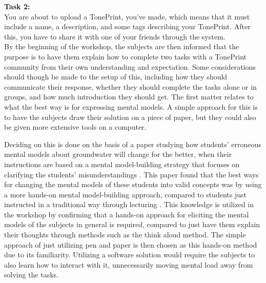 \noindent
\textbf{Task 2:}\\
\noindent
You are about to upload a TonePrint, you've made, which means that it must include a name, a description, and some tags describing your TonePrint. After this, you have to share it with one of your friends through the system.\\

\noindent
By the beginning of the workshop, the subjects are then informed that the purpose is to have them explain how to complete two tasks with a TonePrint community from their own understanding and expectation. Some considerations should though be made to the setup of this, including how they should communicate their response, whether they should complete the tasks alone or in groups, and how much introduction they should get. The first matter relates to what the best way is for expressing mental models. A simple approach for this is to have the subjects draw their solution on a piece of paper, but they could also be given more extensive tools on a computer.

Deciding on this is done on the basis of a paper studying how students' erroneous mental models about groundwater will change for the better, when their instructions are based on a mental model-building strategy that focuses on clarifying the students' misunderstandings \parencite{PDF:HandsOnMentalModelElicitation}. This paper found that the best ways for changing the mental models of these students into valid concepts was by using a more hands-on mental model-building approach, compared to students just instructed in a traditional way through lecturing \parencite[][57]{PDF:HandsOnMentalModelElicitation}. This knowledge is utilized in the workshop by confirming that a hands-on approach for eliciting the mental models of the subjects in general is required, compared to just have them explain their thoughts through methods such as the think aloud method. The simple approach of just utilizing pen and paper is then chosen as this hands-on method due to its familiarity. Utilizing a software solution would require the subjects to also learn how to interact with it, unnecessarily moving mental load away from solving the tasks.

